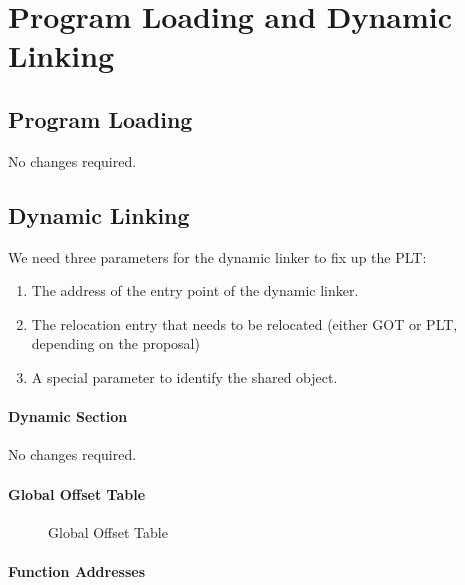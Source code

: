 \chapter{Program Loading and Dynamic Linking}

\section{Program Loading}

No changes required.


\section{Dynamic Linking}

We need three parameters for the dynamic linker to fix up the
PLT:
\begin{enumerate}
\item The address of the entry point of the dynamic linker.
\item The relocation entry that needs to be relocated (either GOT or
  PLT, depending on the proposal)
\item A special parameter to identify the shared object.
\end{enumerate}




\subsubsection{Dynamic Section}

No changes required.

\subsubsection{Global Offset Table}


\begin{figure}[H]
\caption{Global Offset Table}
\begin{center}
\end{center}
\end{figure}

\subsubsection{Function Addresses}

